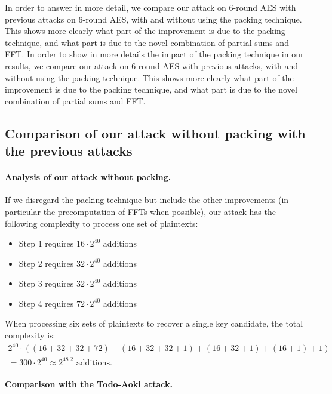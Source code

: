 In order to answer in more detail, we compare our attack on 6-round AES
with previous attacks on 6-round AES, with and without using the
packing technique.  This shows more clearly what part of the improvement
is due to the packing technique, and what part is due to the novel
combination of partial sums and FFT.
\else
In order to show in more details the impact of the packing technique in our results,
we compare our attack on 6-round AES
with previous attacks, with and without using the
packing technique.  This shows more clearly what part of the improvement
is due to the packing technique, and what part is due to the novel
combination of partial sums and FFT.
\fi

\subsection{Comparison of our attack without packing with the previous attacks}

\paragraph{Analysis of our attack without packing.}

If we disregard the packing technique but include the other
improvements (in particular the precomputation of FFTs when possible), our
attack has the following complexity to process one set of plaintexts:
\begin{itemize}
\item Step 1 requires $16 \cdot 2^{40}$ additions
\item Step 2 requires $32 \cdot 2^{40}$ additions
\item Step 3 requires $32 \cdot 2^{40}$ additions
\item Step 4 requires $72 \cdot 2^{40}$ additions
\end{itemize}

When processing six sets of plaintexts to recover a single key candidate,
the total complexity is:
\begin{gather*}
2^{40} \cdot \left((16+32+32+72) + (16+32+32+1) + (16+32+1) +
  (16+1) + 1\right)\\ = 300 \cdot 2^{40} \approx 2^{48.2} \text{~additions.}
\end{gather*}


\paragraph{Comparison with the Todo-Aoki attack.}

